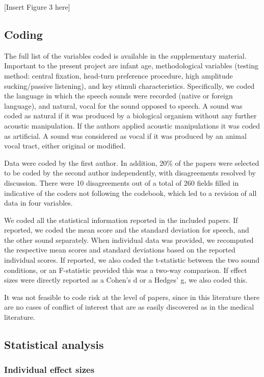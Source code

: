 \documentclass[]{apa6}
\begin{document}
{[}Insert Figure 3 here{]}

\subsection{Coding}\label{coding}

The full list of the variables coded is available in the supplementary
material. Important to the present project are infant age,
methodological variables (testing method: central fixation, head-turn
preference procedure, high amplitude sucking/passive listening), and key
stimuli characteristics. Specifically, we coded the language in which
the speech sounds were recorded (native or foreign language), and
natural, vocal for the sound opposed to speech. A sound was coded as
natural if it was produced by a biological organism without any further
acoustic manipulation. If the authors applied acoustic manipulations it
was coded as artificial. A sound was considered as vocal if it was
produced by an animal vocal tract, either original or modified.

Data were coded by the first author. In addition, 20\% of the papers
were selected to be coded by the second author independently, with
disagreements resolved by discussion. There were 10 disagreements out of
a total of 260 fields filled in indicative of the coders not following
the codebook, which led to a revision of all data in four variables.

We coded all the statistical information reported in the included
papers. If reported, we coded the mean score and the standard deviation
for speech, and the other sound separately. When individual data was
provided, we recomputed the respective mean scores and standard
deviations based on the reported individual scores. If reported, we also
coded the t-statistic between the two sound conditions, or an
F-statistic provided this was a two-way comparison. If effect sizes were
directly reported as a Cohen's d or a Hedges' g, we also coded this.

It was not feasible to code risk at the level of papers, since in this
literature there are no cases of conflict of interest that are as easily
discovered as in the medical literature.

\subsection{Statistical analysis}\label{statistical-analysis}

\subsubsection{Individual effect sizes}\label{individual-effect-sizes}
\end{document}
